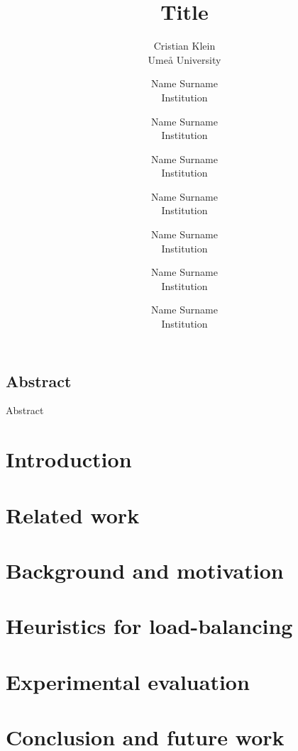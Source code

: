 \documentclass[letterpaper,twocolumn,10pt]{article}
\begin{document}
\date{}
\title{\Large \bf Title}

\author{
{\rm Cristian Klein}\\
Ume{\aa} University
\and
{\rm Name Surname}\\
Institution
\and
{\rm Name Surname}\\
Institution
\and
{\rm Name Surname}\\
Institution
\and
{\rm Name Surname}\\
Institution
\and
{\rm Name Surname}\\
Institution
\and
{\rm Name Surname}\\
Institution
\and
{\rm Name Surname}\\
Institution
} %

\maketitle



\subsection*{Abstract}
Abstract

\section{Introduction}
\label{sec:Introduction}


\section{Related work}
\label{sec:Related}


\section{Background and motivation}
\label{sec:ProblemStatement}


\section{Heuristics for load-balancing}
\label{sec:Solution}


\section{Experimental evaluation}
\label{sec:Results}


\section{Conclusion and future work}
\label{sec:Conclusion}


\printbibliography
\end{document}
